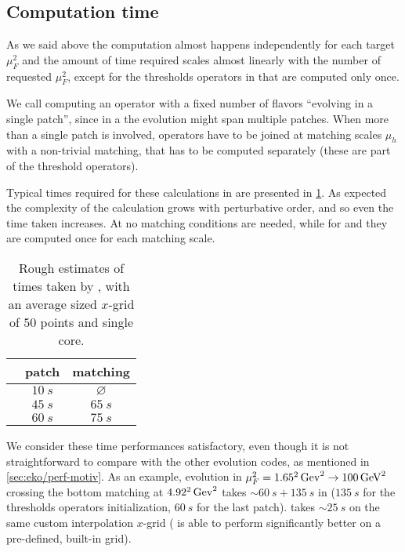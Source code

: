 \subsection{Computation time}
\label{sec:eko/comp-time}

As we said above the computation almost happens independently for each target $\mu_F^2$
and the amount of time required scales almost linearly with the number of requested
$\mu_F^2$, except for the thresholds operators in \vfns{} that are computed only once.

We call computing an operator with a fixed number of flavors \enquote{evolving
in a single patch}, since in a \vfns{} the evolution might span multiple patches.
When more than a single patch is involved, operators have to be joined at
matching scales $\mu_h$ with a non-trivial matching, that has to be
computed separately (these are part of the threshold operators).

Typical times required for these calculations in \eko{} are presented in
\cref{tab:eko/time}.
As expected the complexity of the calculation grows with perturbative order,
and so even the time taken increases.
At \lo{} no matching conditions are needed, while for \nlo{} and
\nnlo{} they are computed once for each matching scale. 

\begin{table}[h]
    \centering
    \begin{tabular}{l|cc}
        & patch & matching \\
        \hline
        \lo{} & $\SI{10}{s}$ & $\varnothing$ \\
        \nlo{} & $\SI{45}{s}$ & $\SI{65}{s}$ \\
        \nnlo{} & $\SI{60}{s}$ & $\SI{75}{s}$ \\
    \end{tabular}
    \caption{Rough estimates of times taken by \eko{}, with an average sized
    $x$-grid of $50$ points and single core.}
    \label{tab:eko/time}
\end{table}

We consider these time performances satisfactory, even though it is not
straightforward to compare \eko{} with the other evolution codes, as mentioned
in \cref{sec:eko/perf-motiv}. As an example, \nnlo{}
evolution in $\mu_F^2 = \SI[parse-numbers=false]{1.65^2}{Gev^2} \to
\SI{100}{GeV^2}$ crossing the bottom matching at
$\SI[parse-numbers=false]{4.92^2}{Gev^2}$ takes $\sim \SI{60}{s} + \SI{135}{s}$
in \eko{} ($\SI{135}{s}$ for the thresholds operators initialization,
$\SI{60}{s}$ for the last patch). \apfel{} takes $\sim\SI{25}{s}$ on the same
custom interpolation $x$-grid (\apfel{} is able to perform significantly better
on a pre-defined, built-in grid).


